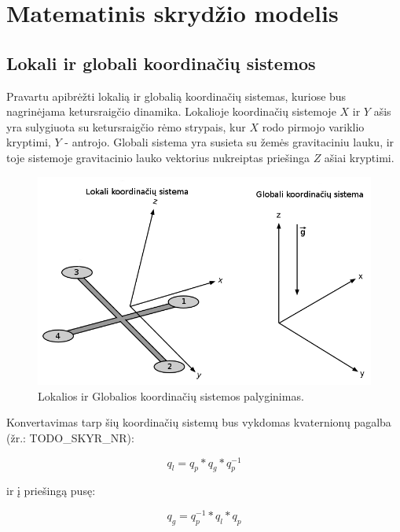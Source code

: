 \documentclass[12pt, a4paper, lithuanian, final]{article}
\begin{document}
\section{Matematinis skrydžio modelis}



\subsection{Lokali ir globali koordinačių sistemos}
Pravartu apibrėžti lokalią ir globalią koordinačių sistemas, kuriose bus nagrinėjama ketursraigčio dinamika.
Lokalioje koordinačių sistemoje $X$ ir $Y$ ašis yra sulygiuota su ketursraigčio rėmo strypais, kur $X$ rodo pirmojo variklio kryptimi, $Y$ - antrojo.
Globali sistema yra susieta su žemės gravitaciniu lauku, ir toje sistemoje gravitacinio lauko vektorius nukreiptas priešinga $Z$ ašiai kryptimi.

\begin{figure}[H]
\begin{center}
\includegraphics[width=1.0\textwidth]{img/Quadcopter_Coordinates.png}
\caption{Lokalios ir Globalios koordinačių sistemos palyginimas.}
\end{center}
\end{figure}


Konvertavimas tarp šių koordinačių sistemų bus vykdomas kvaternionų pagalba (žr.: TODO\_SKYR\_NR):

\begin{equation}
	q_{l} = q_{p} * q_{g} * q_{p}^{-1}
\end{equation}

ir į priešingą pusę:

\begin{equation}
	q_{g} = q_{p}^{-1} * q_{l} * q_{p}
\end{equation}
\end{document}
